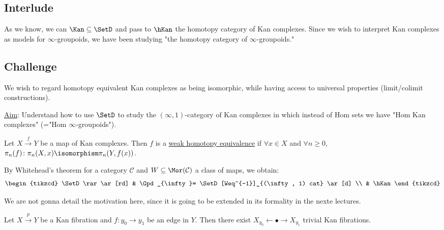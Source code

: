 \subsection{Interlude}

As we know, we can $\Kan \subseteq \SetD $ and pass to $\hKan$ the homotopy category of Kan complexes. 
Since we wish to interpret Kan complexes as models for $\infty$-groupoids, we have been studying "the homotopy category of $\infty$-groupoids."

\subsection{Challenge}

We wish to regard homotopy equivalent Kan complexes as being isomorphic, while having access to universal properties (limit/colimit constructions).

\underline{Aim}: Understand how to use $\SetD$ to study the $(\infty,1)$-category of Kan complexes in which instead of Hom sets we have "Hom Kan complexes" (="Hom $\infty$-groupoids").

\begin{defi}
    Let $X \xrightarrow{f} Y$ be a map of Kan complexes. Then $f$ is a \underline{weak homotopy equivalence} if $\forall x \in X$ and $\forall n \geq 0$, $\pi_n(f) \colon  \pi_n(X,x) \isomorphism \pi_n(Y,f(x))$.
\end{defi}

\begin{rmk}
    By Whitehead's theorem for a category $\mathcal{C}$ and $W \subseteq \Mor (\mathcal{C})$ a class of maps, we obtain:
    \[
    \begin{tikzcd}
        \SetD
        \rar
        \ar[rd]
        &
        \Gpd_{\infty}= \SetD[Weq^{-1}]_{(\infty, 1) cat}
        \ar[d]
        \\
        &
        \hKan
    \end{tikzcd}
    \]
\end{rmk}

We are not gonna detail the motivation here, since it is going to be extended in its formality in the nexte lectures.

\begin{cor}
    Let $X \xrightarrow{p} Y$ be a Kan fibration and $f\colon y_0 \to y_1$ be an edge in $Y$.
    Then there exist $X_{y_0} \xleftarrow{} \bullet \to X_{y_1}$ trivial Kan fibrations.
\end{cor}

